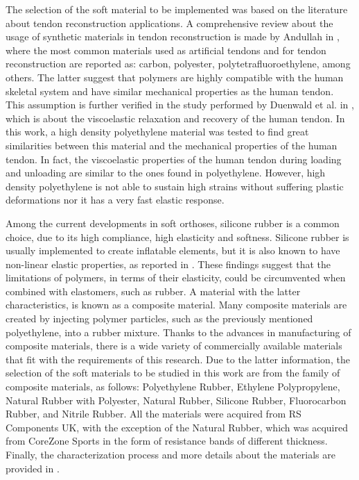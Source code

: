 The selection of the soft material to be implemented was based on the literature about tendon reconstruction applications. A comprehensive review about the usage of synthetic materials in tendon reconstruction is made by Andullah in \cite{abdullah2015usage}, where the most common materials used as artificial tendons and for tendon reconstruction are reported as: carbon, polyester, polytetrafluoroethylene, among others. The latter suggest that polymers are highly compatible with the human skeletal system and have similar mechanical properties as the human tendon. This assumption is further verified in the study performed by Duenwald et al. in \cite{duenwald2009viscoelastic}, which is about the viscoelastic relaxation and recovery of the human tendon. In this work, a high density polyethylene material was tested to find great similarities between this material and the mechanical properties of the human tendon. In fact, the viscoelastic properties of the human tendon during loading and unloading are similar to the ones found in polyethylene. However, high density polyethylene is not able to sustain high strains without suffering plastic deformations nor it has a very fast elastic response.

Among the current developments in soft orthoses, silicone rubber is a common choice, due to its high compliance, high elasticity and softness. Silicone rubber is usually implemented to create inflatable elements, but it is also known to have non-linear elastic properties, as reported in \cite{roylance2008mechanical}. These findings suggest that the limitations of polymers, in terms of their elasticity, could be circumvented when combined with elastomers, such as rubber. A material with the latter characteristics, is known as a composite material. Many composite materials are created by injecting polymer particles, such as the previously mentioned polyethylene, into a rubber mixture. Thanks to the advances in manufacturing of composite materials, there is a wide variety of commercially available materials that fit with the requirements of this research. Due to the latter information, the selection of the soft materials to be studied in this work are from the family of composite materials, as follows: Polyethylene Rubber, Ethylene Polypropylene, Natural Rubber with Polyester, Natural Rubber, Silicone Rubber, Fluorocarbon Rubber, and Nitrile Rubber. All the materials were acquired from RS Components UK\textregistered{}, with the exception of the Natural Rubber, which was acquired from CoreZone Sports\textregistered{} in the form of resistance bands of different thickness. Finally, the characterization process and more details about the materials are provided in .

